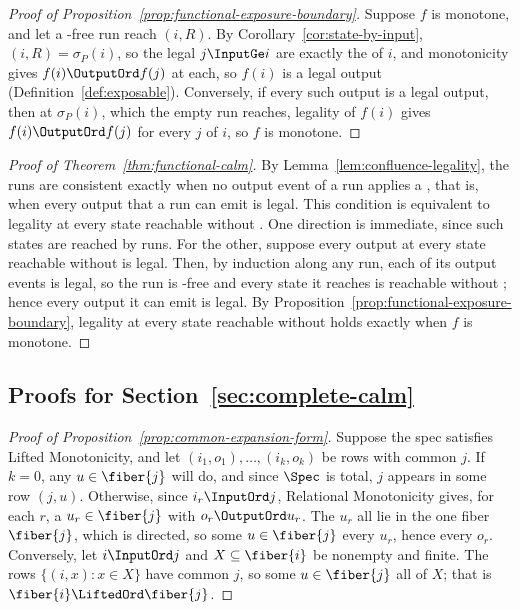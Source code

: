 \begin{proof}[Proof of Proposition~\ref{prop:functional-exposure-boundary}]
Suppose $f$ is monotone, and let a \commitment-free run reach $(i,R)$.  By Corollary~\ref{cor:state-by-input},
$(i,R)=\sigma_P(i)$, so the legal $j\InputGe i$ are exactly the \indescs of
$i$, and monotonicity gives $f(i)\OutputOrd f(j)$ at each, so $f(i)$ is a
legal output (Definition~\ref{def:exposable}).
Conversely, if every such output is a legal output, then at $\sigma_P(i)$,
which the empty run reaches, legality of $f(i)$ gives $f(i)\OutputOrd f(j)$
for every \indesc $j$ of $i$, so $f$ is monotone.
\end{proof}

\begin{proof}[Proof of Theorem~\ref{thm:functional-calm}]
By Lemma~\ref{lem:confluence-legality}, the runs are consistent exactly when
no output event of a run applies a \commitment, that is, when every output that
a run can emit is legal.  This condition is equivalent to
legality at every state reachable without \commitment.  One direction is
immediate, since such states are reached by runs.  For the other, suppose every
output at every state reachable without \commitment is legal.  Then, by
induction along any run, each of its output events is legal, so the run is
\commitment-free and every state it reaches is reachable without \commitment;
hence every output it can emit is legal.  By
Proposition~\ref{prop:functional-exposure-boundary}, legality at every state
reachable without \commitment holds exactly when $f$ is monotone.
\end{proof}

\subsection{Proofs for Section~\ref{sec:complete-calm}}
\label{app:proofs-sec3}

\begin{proof}[Proof of Proposition~\ref{prop:common-expansion-form}]
Suppose the spec satisfies Lifted Monotonicity, and let $(i_1,o_1),\ldots,(i_k,o_k)$ be rows
with common \indesc $j$.  If $k=0$, any $u\in\fiber{j}$ will do, and since
$\Spec$ is total, $j$ appears in some row $(j,u)$.  Otherwise, since $i_r\InputOrd j$, Relational Monotonicity gives, for each
$r$, a $u_r\in\fiber{j}$ with $o_r\OutputOrd u_r$.  The $u_r$ all lie in the
one fiber $\fiber{j}$, which is directed, so some $u\in\fiber{j}$ \outrel
every $u_r$, hence every $o_r$.  Conversely, let $i\InputOrd j$ and
$X\subseteq\fiber{i}$ be nonempty and finite.  The rows $\{(i,x):x\in X\}$
have common \indesc $j$, so some $u\in\fiber{j}$ \outrel all of $X$; that is
$\fiber{i}\LiftedOrd\fiber{j}$.
\end{proof}

